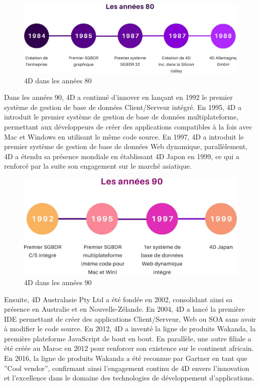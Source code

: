 \begin{figure}[h]
    \centering
    \includegraphics[scale=0.3]{Images/80.jpg} %
    \caption{4D dans les années 80}
    \label{fig:Histoire80}
\end{figure}
\vspace{1cm}
Dans les années 90, 4D a continué d’innover en lançant en 1992 le premier système
de gestion de base de données Client/Serveur intégré. En 1995, 4D a introduit le premier
système de gestion de base de données multiplateforme, permettant aux développeurs de
créer des applications compatibles à la fois avec Mac et Windows en utilisant le même code
source. En 1997, 4D a introduit le premier système de gestion de base de données Web
dynamique, parallèlement, 4D a étendu sa présence mondiale en établissant 4D Japon en
1999, ce qui a renforcé par la suite son engagement sur le marché asiatique.

\begin{figure}[h]
    \centering
    \includegraphics[scale=0.3]{Images/90.jpg} %
    \caption{4D dans les années 90}
    \label{fig:Histoire90}
\end{figure}

Ensuite, 4D Australasie Pty Ltd a été fondée en 2002, consolidant ainsi sa présence
en Australie et en Nouvelle-Zélande. En 2004, 4D a lancé la première IDE permettant de
créer des applications Client/Serveur, Web ou SOA sans avoir à modifier le code source.
En 2012, 4D a inventé la ligne de produits Wakanda, la première plateforme JavaScript de
bout en bout. En parallèle, une autre filiale a été créée au Maroc en 2012 pour renforcer
son existence sur le continent africain.
En 2016, la ligne de produits Wakanda a été reconnue par Gartner en tant que ”Cool
vendor”, confirmant ainsi l’engagement continu de 4D envers l’innovation et l’excellence
dans le domaine des technologies de développement d’applications.

